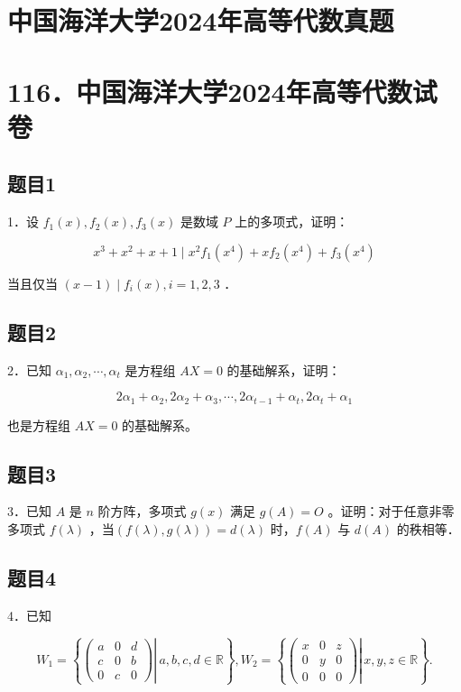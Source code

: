 \documentclass{article}
\begin{document}
\section*{中国海洋大学2024年高等代数真题}
\section*{116．中国海洋大学2024年高等代数试卷}

\subsection{题目1}
1．设 \(f_{1}(x), f_{2}(x), f_{3}(x)\) 是数域 \(P\) 上的多项式，证明：

\[
x^{3}+x^{2}+x+1 \mid x^{2} f_{1}\left(x^{4}\right)+x f_{2}\left(x^{4}\right)+f_{3}\left(x^{4}\right)
\]

当且仅当 \((x-1) \mid f_{i}(x), i=1,2,3\) ．

\subsection{题目2}
2．已知 \(\alpha_{1}, \alpha_{2}, \cdots, \alpha_{t}\) 是方程组 \(A X=0\) 的基础解系，证明：

\[
2 \alpha_{1}+\alpha_{2}, 2 \alpha_{2}+\alpha_{3}, \cdots, 2 \alpha_{t-1}+\alpha_{t}, 2 \alpha_{t}+\alpha_{1}
\]

也是方程组 \(A X=0\) 的基础解系。

\subsection{题目3}
3．已知 \(A\) 是 \(n\) 阶方阵，多项式 \(g(x)\) 满足 \(g(A)=O\) 。证明：对于任意非零多项式 \(f(\lambda)\) ，当\((f(\lambda), g(\lambda))=d(\lambda)\) 时，\(f(A)\) 与 \(d(A)\) 的秩相等．

\subsection{题目4}
4．已知

\[
W_{1}=\left\{\left.\left(\begin{array}{ccc}
a & 0 & d \\
c & 0 & b \\
0 & c & 0
\end{array}\right) \right\rvert\, a, b, c, d \in \mathbb{R}\right\}, W_{2}=\left\{\left.\left(\begin{array}{ccc}
x & 0 & z \\
0 & y & 0 \\
0 & 0 & 0
\end{array}\right) \right\rvert\, x, y, z \in \mathbb{R}\right\} .
\]
\end{document}
